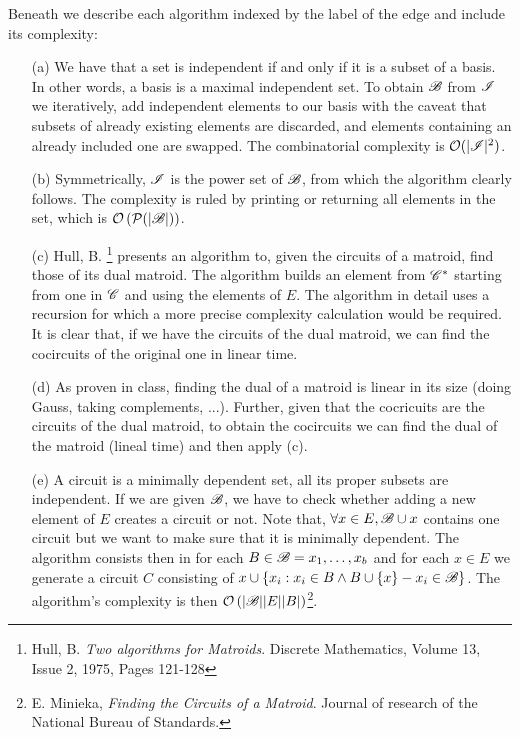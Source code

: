 Beneath we describe each algorithm indexed by the label of the edge and include its complexity:
\begin{itemize}
    \item[(a)] 
        We have that a set is independent if and only if it is a subset of a basis.
        In other words, a basis is a maximal independent set.
        To obtain $\mathscr{B}$ from $\mathscr{I}$ we iteratively, add independent elements to our basis with the caveat that subsets of already existing elements are discarded, and elements containing an already included one are swapped.
        The combinatorial complexity is $\mathcal{O}(|\mathscr{I}|^2)$.
    \item[(b)] Symmetrically, $\mathscr{I}$ is the power set of $\mathscr{B}$, from which the algorithm clearly follows. The complexity is ruled by printing or returning all elements in the set, which is $\mathcal{O}\left(\mathcal{P}(|\mathscr{B}|)\right)$.
    \item[(c)] Hull, B. \footnote{Hull, B. \textit{Two algorithms for Matroids}. Discrete Mathematics, Volume 13, Issue 2, 1975, Pages 121-128} presents an algorithm to, given the circuits of a matroid, find those of its dual matroid. The algorithm builds an element from $\mathscr{C}^*$ starting from one in $\mathscr{C}$ and using the elements of $E$. The algorithm in detail uses a recursion for which a more precise complexity calculation would be required. It is clear that, if we have the circuits of the dual matroid, we can find the cocircuits of the original one in linear time.
    \item[(d)] As proven in class, finding the dual of a matroid is linear in its size (doing Gauss, taking complements, ...). Further, given that the cocricuits are the circuits of the dual matroid, to obtain the cocircuits we can find the dual of the matroid (lineal time) and then apply (c).
    \item[(e)] A circuit is a minimally dependent set, all its proper subsets are independent. If we are given $\mathscr{B}$, we have to check whether adding a new element of $E$ creates a circuit or not. Note that, $\forall x \in E, \mathscr{B} \cup x$ contains one circuit but we want to make sure that it is minimally dependent. The algorithm consists then in for each $B \in \mathscr{B} = {x_1, \dots, x_b}$ and for each $x \in E$ we generate a circuit $C$ consisting of $x \cup \lbrace x_i : x_i \in B \wedge B \cup \{ x\} - x_i \in \mathscr{B} \rbrace$. The algorithm's complexity is then $\mathcal{O}\left(|\mathscr{B}||E||B|\right)$\footnote{E. Minieka, \textit{Finding the Circuits of a Matroid}. Journal of research of the National Bureau of Standards.}.

\end{itemize}
